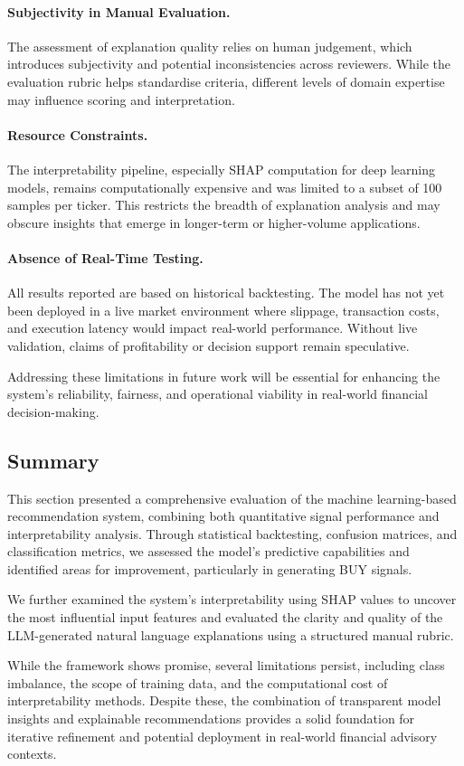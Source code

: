 \paragraph{Subjectivity in Manual Evaluation.}  
The assessment of explanation quality relies on human judgement, which introduces subjectivity and potential inconsistencies across reviewers. While the evaluation rubric helps standardise criteria, different levels of domain expertise may influence scoring and interpretation.

\paragraph{Resource Constraints.}  
The interpretability pipeline, especially SHAP computation for deep learning models, remains computationally expensive and was limited to a subset of 100 samples per ticker. This restricts the breadth of explanation analysis and may obscure insights that emerge in longer-term or higher-volume applications.

\paragraph{Absence of Real-Time Testing.}  
All results reported are based on historical backtesting. The model has not yet been deployed in a live market environment where slippage, transaction costs, and execution latency would impact real-world performance. Without live validation, claims of profitability or decision support remain speculative.

\bigskip

Addressing these limitations in future work will be essential for enhancing the system’s reliability, fairness, and operational viability in real-world financial decision-making.

\subsection{Summary}

This section presented a comprehensive evaluation of the machine learning-based recommendation system, combining both quantitative signal performance and interpretability analysis. Through statistical backtesting, confusion matrices, and classification metrics, we assessed the model’s predictive capabilities and identified areas for improvement, particularly in generating BUY signals.

We further examined the system’s interpretability using SHAP values to uncover the most influential input features and evaluated the clarity and quality of the LLM-generated natural language explanations using a structured manual rubric.

While the framework shows promise, several limitations persist, including class imbalance, the scope of training data, and the computational cost of interpretability methods. Despite these, the combination of transparent model insights and explainable recommendations provides a solid foundation for iterative refinement and potential deployment in real-world financial advisory contexts.
